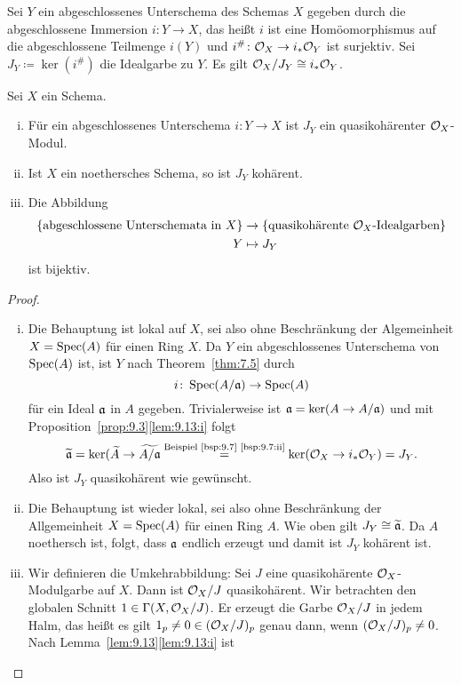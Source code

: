 \begin{defn}
\label{defn:9.14}
	Sei $Y$ ein abgeschlossenes Unterschema des Schemas $X$ gegeben durch die abgeschlossene Immersion $i \colon Y \to X$, das heißt $i$ ist eine Homöomorphismus auf die abgeschlossene Teilmenge $i(Y)$ und $i^{\#}\colon \mathcal{O}_X \to i_*\mathcal{O}_Y$ ist surjektiv. Sei $J_Y\coloneqq \ker(i^{\#})$ die Idealgarbe zu $Y$. Es gilt $\mathcal{O}_X/J_Y \cong i_*\mathcal{O}_Y$.
\end{defn}

\begin{prop}
\label{prop:9.15}
	Sei $X$ ein Schema.
	\begin{enumerate}[i)]
		\item\label{prop:9.15:i} Für ein abgeschlossenes Unterschema $i \colon Y \to X$ ist $J_Y$ ein quasikohärenter $\mathcal{O}_X$-Modul.
		\item\label{prop:9.15:ii} Ist $X$ ein noethersches Schema, so ist $J_Y$ kohärent.
		\item\label{prop:9.15:iii} Die Abbildung
		\begin{align*}
			\{\text{abgeschlossene Unterschemata in } X\} & \to \{\text{quasikohärente }\mathcal{O}_X\text{-Idealgarben}\}\\
			Y &\mapsto J_Y
		\end{align*}
		ist bijektiv.
 	\end{enumerate}
 	\begin{proof}
 		\begin{enumerate}[i)]
 			\item Die Behauptung ist lokal auf $X$, sei also ohne Beschränkung der Algemeinheit $X=\operatorname{Spec}(A)$ für einen Ring $X$. Da $Y$ ein abgeschlossenes Unterschema von $\operatorname{Spec}(A)$ ist, ist $Y$ nach Theorem~\ref{thm:7.5} durch
 			\[
 				i\colon \operatorname{Spec}(A/\mathfrak{a}) \to \operatorname{Spec}(A)
 			\]
 			für ein Ideal $\mathfrak{a}$ in $A$ gegeben. Trivialerweise ist $\mathfrak{a} = \ker(A \to A/\mathfrak{a})$ und mit Proposition~\ref{prop:9.3}\ref{lem:9.13:i} folgt
 			\[
 				\widetilde{\mathfrak{a}} = \ker(\widetilde{A} \to \widetilde{A/\mathfrak{a}} \overset{\text{Beispiel~\ref{bsp:9.7}~\ref{bsp:9.7:ii}}}{=} \ker(\mathcal{O}_X \to i_* \mathcal{O}_Y) = J_Y.
 			\]
 			Also ist $J_Y$ quasikohärent wie gewünscht.
 			\item Die Behauptung ist wieder lokal, sei also ohne Beschränkung der Allgemeinheit $X = \operatorname{Spec}(A)$ für einen Ring $A$. Wie oben gilt $J_Y \cong \widetilde{\mathfrak{a}}$. Da $A$ noethersch ist, folgt, dass $\mathfrak{a}$ endlich erzeugt und damit ist $J_Y$ kohärent ist.
 			\item Wir definieren die Umkehrabbildung: Sei $J$ eine quasikohärente $\mathcal{O}_X$-Modulgarbe auf $X$. Dann ist $\mathcal{O}_X/J$ quasikohärent. Wir betrachten den globalen Schnitt $1 \in \Gamma(X,\mathcal{O}_X/J)$. Er erzeugt die Garbe $\mathcal{O}_X/J$ in jedem Halm, das heißt es gilt $1_p \ne 0 \in (\mathcal{O}_X/J)_p$ genau dann, wenn $(\mathcal{O}_X/J)_p \ne 0$. Nach Lemma~\ref{lem:9.13}\ref{lem:9.13:i} ist

\end{enumerate}
\end{proof}
\end{prop}

